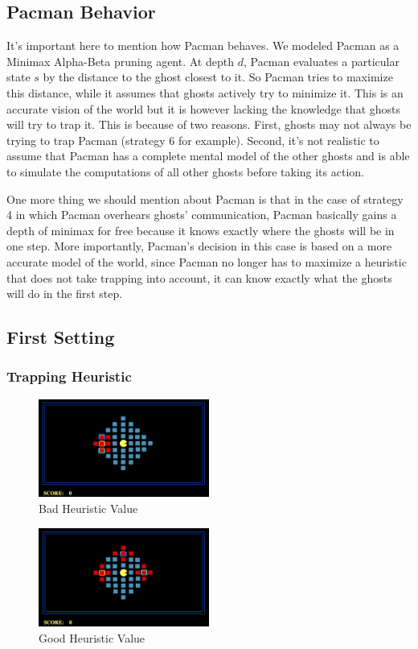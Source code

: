 \documentclass[11pt]{article}
\begin{document}
\subsection{Pacman Behavior}
It's important here to mention how Pacman behaves. We modeled Pacman as a Minimax Alpha-Beta pruning agent. At depth $d$, Pacman evaluates a particular state $s$ by the distance to the ghost closest to it. So Pacman tries to maximize this distance, while it assumes that ghosts actively try to minimize it. This is an accurate vision of the world but it is however lacking the knowledge that ghosts will try to trap it. This is because of two reasons. First, ghosts may not always be trying to trap Pacman (strategy 6 for example). Second, it's not realistic to assume that Pacman has a complete mental model of the other ghosts and is able to simulate the computations of all other ghosts before taking its action.

One more thing we should mention about Pacman is that in the case of strategy 4 in which Pacman overhears ghosts' communication, Pacman basically gains a depth of minimax for free because it knows exactly where the ghosts will be in one step. More importantly, Pacman's decision in this case is based on a more accurate model of the world, since Pacman no longer has to maximize a heuristic that does not take trapping into account, it can know exactly what the ghosts will do in the first step.

\subsection{First Setting}
\subsubsection{Trapping Heuristic}

\begin{figure}[H]
	\includegraphics[width=0.5\textwidth]{badheuristic.png}
	\caption{Bad Heuristic Value}
	\label{fig:badheuristic}
\end{figure}

\begin{figure}[H]
	\includegraphics[width=0.5\textwidth]{goodheuristic.png}
	\caption{Good Heuristic Value}
	\label{fig:goodheuristic}
\end{figure}
\end{document}
